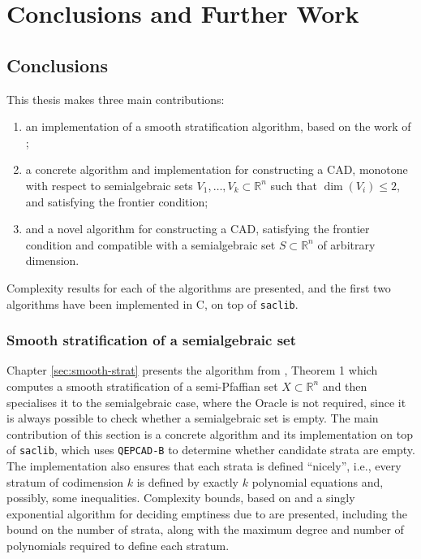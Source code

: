 \documentclass[
]{book}
\providecommand{\tightlist}{%
  \setlength{\itemsep}{0pt}\setlength{\parskip}{0pt}}
\theoremstyle{definition}
\theoremstyle{definition}
\theoremstyle{definition}
\theoremstyle{definition}
\theoremstyle{remark}
\begin{document}
\hypertarget{sec:conclusions}{%
\chapter{Conclusions and Further Work}\label{sec:conclusions}}

\hypertarget{conclusions}{%
\section{Conclusions}\label{conclusions}}

This thesis makes three main contributions:

\begin{enumerate}
\def\labelenumi{\arabic{enumi}.}
\tightlist
\item
  an implementation of a smooth stratification algorithm, based on the work of \citet{gv1995};
\item
  a concrete algorithm and implementation for constructing a CAD, monotone with respect to semialgebraic sets \(V_1,\ldots,V_k \subset \mathbb{R}^n\) such that \(\dim(V_i) \le 2\), and satisfying the frontier condition;
\item
  and a novel algorithm for constructing a CAD, satisfying the frontier condition and compatible with a semialgebraic set \(S \subset \mathbb{R}^n\) of arbitrary dimension.
\end{enumerate}

Complexity results for each of the algorithms are presented, and the first two algorithms have been implemented in C, on top of \texttt{saclib}.

\hypertarget{smooth-stratification-of-a-semialgebraic-set}{%
\subsection{Smooth stratification of a semialgebraic set}\label{smooth-stratification-of-a-semialgebraic-set}}

Chapter \ref{sec:smooth-strat} presents the algorithm from \citet{gv1995}, Theorem 1 which computes a smooth stratification of a semi-Pfaffian set \(X \subset \mathbb{R}^n\) and then specialises it to the semialgebraic case, where the Oracle is not required, since it is always possible to check whether a semialgebraic set is empty. The main contribution of this section is a concrete algorithm and its implementation on top of \texttt{saclib}, which uses \texttt{QEPCAD-B} to determine whether candidate strata are empty. The implementation also ensures that each strata is defined ``nicely'', i.e., every stratum of codimension \(k\) is defined by exactly \(k\) polynomial equations and, possibly, some inequalities.
Complexity bounds, based on \citet{gv1995} and a singly exponential algorithm for deciding emptiness due to \citet{bpr98} are presented, including the bound on the number of strata, along with the maximum degree and number of polynomials required to define each stratum.
\end{document}
